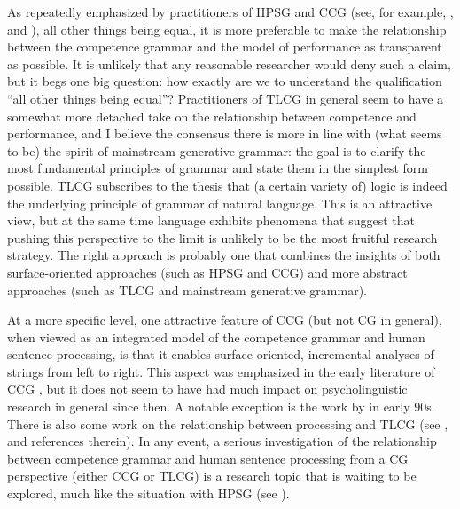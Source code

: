\documentclass[output=paper
                ,modfonts
                ,nonflat
	        ,collection
	        ,collectionchapter
	        ,collectiontoclongg
 	        ,biblatex
                ,babelshorthands
                ,newtxmath
                ,draftmode
                ,colorlinks, citecolor=brown
]{./langsci/langscibook}
\begin{document}
As repeatedly emphasized by practitioners of HPSG and CCG (see, for
example, \citealt{SW2011a}, \citealt{steedman2012} and
), all other things being equal, it is more
preferable to make the relationship between the competence grammar and
the model of performance as transparent as possible. It is
unlikely that any reasonable
researcher would deny such a claim, but it begs one big question:
how exactly are we to understand the qualification ``all other things
being equal''? Practitioners of TLCG in general seem to have a somewhat more
detached take on the relationship between competence and performance, 
and I believe the consensus there is more in line with (what seems to be)
the spirit of mainstream generative grammar: the goal is to clarify
the most fundamental principles of grammar and state them in the
simplest form possible. TLCG subscribes to the thesis that (a certain
variety of) logic is indeed the underlying principle of grammar of
natural language. This is an attractive view, but at the same time
language exhibits phenomena that suggest that pushing this perspective
to the limit is unlikely to be the most fruitful research strategy. The
right approach is probably one that combines the insights of both 
surface-oriented approaches (such as HPSG and CCG) and more abstract
approaches (such as TLCG and mainstream generative grammar).

At a more specific level, one attractive feature of CCG (but not CG in
general), when viewed as an integrated model of the competence grammar
and human sentence processing, is that it enables surface-oriented,
incremental analyses of strings from left to right. This aspect was
emphasized in the early literature of CCG \citep{AS82a,CS85a}, but it
does not seem to have had much impact on psycholinguistic research in
general since then. A notable exception is the work by
\citet{pickering-barry91,PB93a} in early 90s. There is also some work
on the relationship between processing and TLCG (see \citealt[Chapters 9 and 10]{morrill2011},
and references therein). In any event, a serious
investigation of the relationship between competence grammar and human
sentence processing from a CG perspective (either CCG or TLCG) is a
research topic that is waiting to be explored, much like the situation
with HPSG (see ).
\end{document}
